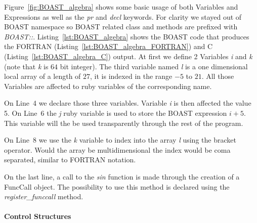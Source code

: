 \documentclass[11pt, a4paper, twoside]{montblanc}
\begin{document}
Figure~\ref{fig:BOAST_algebra} shows some basic usage of both Variables and
Expressions as well as the \emph{pr} and \emph{decl} keywords. For clarity we
stayed out of BOAST namespace so BOAST related class and methods are prefixed
with \emph{BOAST::}. Listing~\ref{lst:BOAST_algebra} shows the BOAST code that
produces the FORTRAN (Listing~\ref{lst:BOAST_algebra_FORTRAN}) and C
(Listing~\ref{lst:BOAST_algebra_C}) output. At first we define 2 Variables
\emph{i} and \emph{k} (note that \emph{k} is $64$ bit integer). The third
variable named \emph{l} is a one dimensional local array of a length of $27$, it
is indexed in the range $-5$ to $21$. All those Variables are affected to ruby
variables of the corresponding name.

On Line~4 we declare those three variables. Variable \emph{i} is then affected
the value 5. On Line~6 the \emph{j} ruby variable is used to store the BOAST
expression \emph{$i+5$}. This variable will the be used transparently through
the rest of the program.

On Line~8 we use the \emph{k} variable to index into the array \emph{l} using
the bracket operator. Would the array be multidimensional the index would be
coma separated, similar to FORTRAN notation.

On the last line, a call to the \emph{sin} function is made through the creation
of a FuncCall object.  The possibility to use this method is declared using the
\emph{register\_funccall} method.

      \paragraph{Control Structures}
\end{document}
